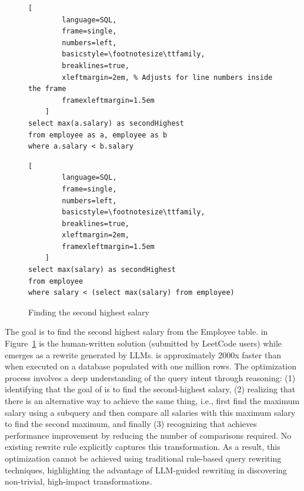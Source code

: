 \begin{figure}[h]
  \centering
  \begin{minipage}{.47\textwidth}
    \begin{lstlisting}[
        language=SQL, 
        frame=single, 
        numbers=left, 
        basicstyle=\footnotesize\ttfamily, 
        breaklines=true,
        xleftmargin=2em, % Adjusts for line numbers inside the frame
        framexleftmargin=1.5em
    ]
select max(a.salary) as secondHighest
from employee as a, employee as b
where a.salary < b.salary
    \end{lstlisting}
    \vspace{-2mm}
    \captionsetup{font=small}
    \caption*{Q1: Cartesian product}
  \end{minipage}
  \hfill
  \begin{minipage}{.47\textwidth}
    \begin{lstlisting}[
        language=SQL, 
        frame=single, 
        numbers=left, 
        basicstyle=\footnotesize\ttfamily, 
        breaklines=true,
        xleftmargin=2em,
        framexleftmargin=1.5em
    ]
select max(salary) as secondHighest
from employee
where salary < (select max(salary) from employee)
    \end{lstlisting}
    \vspace{-2mm}
    \captionsetup{font=small}
    \caption*{Q2: with subquery}
  \end{minipage}
  
  \vspace{1mm}
  \captionsetup{font=small}
  \caption{Finding the second highest salary}
  \inv
  \label{gen:fig:sql-comparison}
\end{figure}






 The goal is to find the second highest salary from the Employee table.  in Figure~\ref{gen:fig:sql-comparison} is the human-written solution (submitted by LeetCode users) while  emerges as a rewrite generated by LLMs.  is approximately 2000x faster than  when executed on a database  populated with one million rows. 
The optimization process involves a deep understanding of the query intent through reasoning: (1) identifying that the goal of  is to find the second-highest salary, (2) realizing that there is an alternative way to achieve the same thing, i.e., first find the maximum salary using a subquery and then compare all salaries with this maximum salary to find the second maximum, and finally (3) recognizing that  achieves performance improvement by reducing the number of comparisons required. No existing rewrite rule explicitly captures this transformation. As a result, this optimization cannot be achieved using traditional rule-based query rewriting techniques, highlighting the advantage of LLM-guided rewriting in discovering non-trivial, high-impact transformations.

